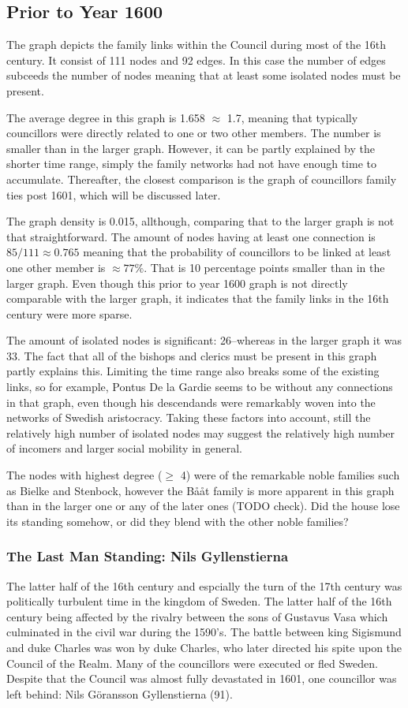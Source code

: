 \subsection{Prior to Year 1600}
The graph depicts the family links within the Council during most of the 16th century. It consist of 111 nodes and 92 edges. In this case the number of edges subceeds the number of nodes meaning that at least some isolated nodes must be present. 

The average degree in this graph is 1.658 $\approx$ 1.7, meaning that typically councillors were directly related to one or two other members. The number is smaller than in the larger graph. However, it can be partly explained by the shorter time range, simply the family networks had not have enough time to accumulate. Thereafter, the closest comparison is the graph of councillors family ties post 1601, which will be discussed later.

The graph density is 0.015, allthough, comparing that to the larger graph is not that straightforward. The amount of nodes having at least one connection is $85/111 \approx 0.765$ meaning that the probability of councillors to be linked at least one other member is $\approx 77\%$. That is 10 percentage points smaller than in the larger graph. Even though this prior to year 1600 graph is not directly comparable with the larger graph, it indicates that the family links in the 16th century were more sparse.

The amount of isolated nodes is significant: 26–whereas in the larger graph it was 33. The fact that all of the bishops and clerics must be present in this graph partly explains this. Limiting the time range also breaks some of the existing links, so for example, Pontus De la Gardie seems to be without any connections in that graph, even though his descendands were remarkably woven into the networks of Swedish aristocracy. Taking these factors into account, still the relatively high number of isolated nodes may suggest the relatively high number of incomers and larger social mobility in general.

The nodes with highest degree ($\geq$ 4) were of the remarkable noble families such as Bielke and Stenbock, however the Bååt family is more apparent in this graph than in the larger one or any of the later ones (TODO check). Did the house lose its standing somehow, or did they blend with the other noble families?

\subsubsection{The Last Man Standing: Nils Gyllenstierna}
The latter half of the 16th century and espcially the turn of the 17th century was politically turbulent time in the kingdom of Sweden. The latter half of the 16th century being affected by the rivalry between the sons of Gustavus Vasa which culminated in the civil war during the 1590's. The battle between king Sigismund and duke Charles was won by duke Charles, who later directed his spite upon the Council of the Realm. Many of the councillors were executed or fled Sweden. Despite that the Council was almost fully devastated in 1601, one councillor was left behind: Nils Göransson Gyllenstierna (91).

